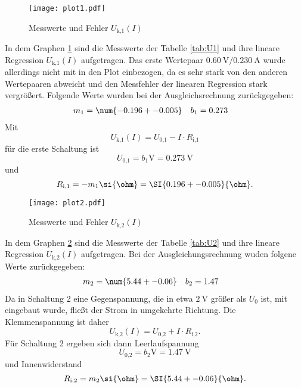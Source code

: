   \newpage

  \begin{figure}[h]
    \texttt{[image: plot1.pdf]}
    \label{fig:U1}
    \caption{Messwerte und Fehler $U_\text{k,1}(I)$}
  \end{figure}

  In dem Graphen \ref{fig:U1} sind die Messwerte der Tabelle
  \ref{tab:U1} und ihre lineare Regression
  $U_\text{k,1}(I)$ aufgetragen.
  Das erste Wertepaar $\SI{0.60}{\V}/ \SI{0.230}{\A}$
  wurde allerdings nicht mit in den Plot einbezogen,
  da es sehr stark von den anderen Wertepaaren abweicht und
  den Messfehler der linearen Regression stark vergrößert.
  Folgende Werte wurden bei der Ausgleichsrechnung zurückgegeben:
  \begin{align}
    m_1 & = \num{-0.196 +- 0.005} & b_1 & = 0.273
  \end{align}
  Mit
  \begin{equation}
    U_\text{k,1}(I) = U_\text{0,1} - I \cdot R_\text{i,1}
  \end{equation}
  für die erste Schaltung ist
  \begin{equation}
    U_\text{0,1} = b_1 \si{\V} = \SI{0.273}{\V}
  \end{equation}
  und
  \begin{equation}
    R_\text{i,1} = -m_1 \si{\ohm} = \SI{0.196 +- 0.005}{\ohm}.
  \end{equation}

  \newpage

  \begin{figure}[h]
    \texttt{[image: plot2.pdf]}
    \label{fig:U2}
    \caption{Messwerte und Fehler $U_\text{k,2}(I)$}
  \end{figure}

  In dem Graphen \ref{fig:U2} sind die Messwerte der Tabelle
  \ref{tab:U2} und ihre lineare Regression
  $U_\text{k,2}(I)$ aufgetragen.
  Bei der Ausgleichungsrechnung wuden folgene Werte zurückgegeben:
  \begin{align}
    m_2 & = \num{5.44 +- 0.06} & b_2 & = 1.47
  \end{align}
  Da in Schaltung 2 eine Gegenspannung, die in etwa $\SI{2}{\V}$ größer als
  $U_0$ ist, mit eingebaut wurde, fließt der Strom in umgekehrte Richtung.
  Die Klemmenspannung ist daher
  \begin{equation}
    U_\text{k,2}(I) = U_\text{0,2} + I \cdot R_\text{i,2}.
  \end{equation}
  Für Schaltung 2 ergeben sich dann Leerlaufspannung
  \begin{equation}
    U_\text{0,2} = b_2 \si{\V} = \SI{1.47}{\V}
  \end{equation}
  und Innenwiderstand
  \begin{equation}
    R_\text{i,2} = m_2 \si{\ohm} = \SI{5.44 +- 0.06}{\ohm}.
  \end{equation}

